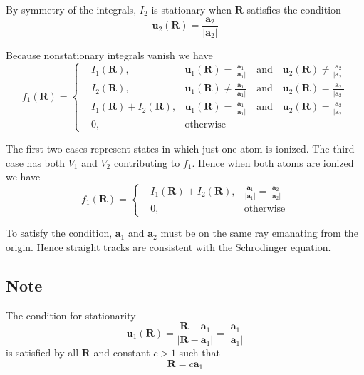\documentclass[12pt]{article}
\begin{document}
By symmetry of the integrals, $I_2$ is stationary when $\mathbf R$ satisfies the condition
\begin{equation*}
\mathbf u_2(\mathbf R)
=\frac{\mathbf a_2}{|\mathbf a_2|}
\end{equation*}

Because nonstationary integrals vanish we have
\begin{equation*}
f_1(\mathbf R)=\left\{
\begin{aligned}
& I_1(\mathbf R),
& \mathbf u_1(\mathbf R)=\frac{\mathbf a_1}{|\mathbf a_1|}
\quad\text{and}\quad
\mathbf u_2(\mathbf R)\ne\frac{\mathbf a_2}{|\mathbf a_2|}
\\
& I_2(\mathbf R),
& \mathbf u_1(\mathbf R)\ne\frac{\mathbf a_1}{|\mathbf a_1|}
\quad\text{and}\quad
\mathbf u_2(\mathbf R)=\frac{\mathbf a_2}{|\mathbf a_2|}
\\
& I_1(\mathbf R)+I_2(\mathbf R),
& \mathbf u_1(\mathbf R)=\frac{\mathbf a_1}{|\mathbf a_1|}
\quad\text{and}\quad
\mathbf u_2(\mathbf R)=\frac{\mathbf a_2}{|\mathbf a_2|}
\\
& 0, & \text{otherwise}
\end{aligned}
\right.
\end{equation*}

The first two cases represent states in which just one atom is ionized.
The third case has both $V_1$ and $V_2$ contributing to $f_1$.
Hence when both atoms are ionized we have
\begin{equation*}
f_1(\mathbf R)=\left\{
\begin{aligned}
& I_1(\mathbf R)+I_2(\mathbf R),
& \frac{\mathbf a_1}{|\mathbf a_1|}=\frac{\mathbf a_2}{|\mathbf a_2|}
\\
& 0, & \text{otherwise}
\end{aligned}
\right.
\end{equation*}

To satisfy the condition, $\mathbf a_1$ and $\mathbf a_2$
must be on the same ray emanating from the origin.
Hence straight tracks are consistent with the Schrodinger equation.

\subsection*{Note}
The condition for stationarity
\begin{equation*}
\mathbf u_1(\mathbf R)
=\frac{\mathbf R-\mathbf a_1}{|\mathbf R-\mathbf a_1|}
=\frac{\mathbf a_1}{|\mathbf a_1|}
\end{equation*}
is satisfied by all $\mathbf R$ and constant $c>1$ such that
\begin{equation*}
\mathbf R=c\mathbf a_1
\end{equation*}
\end{document}
